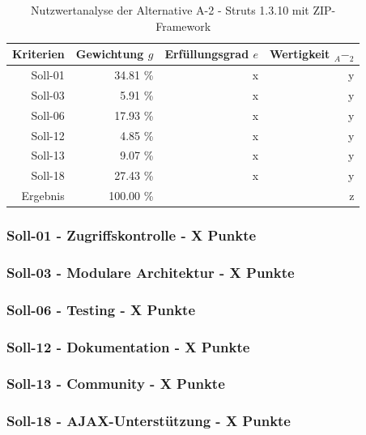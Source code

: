   \begin{table}[ht]
    \sffamily 
    \begin{center}
      \begin{tabular}{r|rrr}
        \toprule
        Kriterien & Gewichtung \(g\) & Erfüllungsgrad \(e\) & Wertigkeit
        \(_A-_2\) \\
        \midrule
        Soll-01   & 34.81 \% & x & y \\
        Soll-03   &  5.91 \% & x & y \\
        Soll-06   & 17.93 \% & x & y \\
        Soll-12   &  4.85 \% & x & y \\
        Soll-13   &  9.07 \% & x & y \\
        Soll-18   & 27.43 \% & x & y \\
        \midrule
        \midrule
        Ergebnis  & 100.00 \% &   & z \\
        \bottomrule
      \end{tabular}
      \caption{Nutzwertanalyse der Alternative A-2 - Struts 1.3.10 mit
      ZIP-Framework}
      \label{tab:nwaA2}
    \end{center}
  \end{table}
    
  \subsubsection{Soll-01 - Zugriffskontrolle - X Punkte}
  
  \subsubsection{Soll-03 - Modulare Architektur - X Punkte}
  
  \subsubsection{Soll-06 - Testing - X Punkte}
  
  \subsubsection{Soll-12 - Dokumentation - X Punkte}
  
  \subsubsection{Soll-13 - Community - X Punkte}

  \subsubsection{Soll-18 - AJAX-Unterstützung - X Punkte}
  
